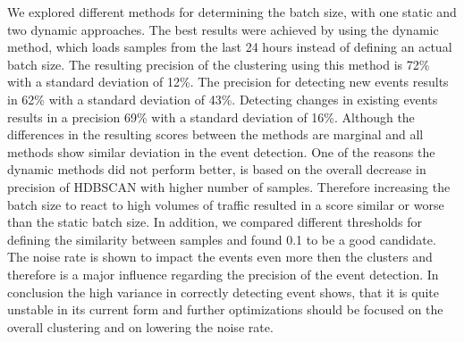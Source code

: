 We explored different methods for determining the batch size, with one static and two dynamic approaches. The best results were achieved by using the dynamic method, which loads samples from the last 24 hours instead of defining an actual batch size. The resulting precision of the clustering using this method is 72\% with a standard deviation of 12\%. The precision for detecting new events results in 62\% with a standard deviation of 43\%. Detecting changes in existing events results in a precision 69\% with a standard deviation of 16\%. Although the differences in the resulting scores between the methods are marginal and all methods show similar deviation in the event detection. One of the reasons the dynamic methods did not perform better, is based on the overall decrease in precision of HDBSCAN with higher number of samples. Therefore increasing the batch size to react to high volumes of traffic resulted in a score similar or worse than the static batch size. In addition, we compared different thresholds for defining the similarity between samples and found 0.1 to be a good candidate. The noise rate is shown to impact the events even more then the clusters and therefore is a major influence regarding the precision of the event detection. In conclusion the high variance in correctly detecting event shows, that it is quite unstable in its current form and further optimizations should be
focused on the overall clustering and on lowering the noise rate.